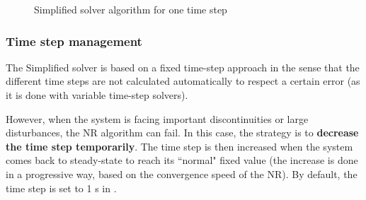 \documentclass[a4paper, 12pt]{report}
\begin{document}
\begin{figure}
\begin{adjustbox}{width=\textwidth,height=\textheight,keepaspectratio}
\end{adjustbox}
\caption{Simplified solver algorithm for one time step}
\label{fig:AlgoSim}
\end{figure}

\subsubsection{Time step management}

The Simplified solver is based on a fixed time-step approach in the sense that the different time steps are not calculated automatically to respect a certain error (as it is done with variable time-step solvers).

However, when the system is facing important discontinuities or large disturbances, the \ac{NR} algorithm can fail. In this case, the strategy is to \textbf{decrease the time step temporarily}. The time step is then increased when the system comes back to steady-state to reach its ``normal" fixed value (the increase is done in a progressive way, based on the convergence speed of the \ac{NR}). By default, the time step is set to 1 s in \Dynawo. \\
\end{document}
